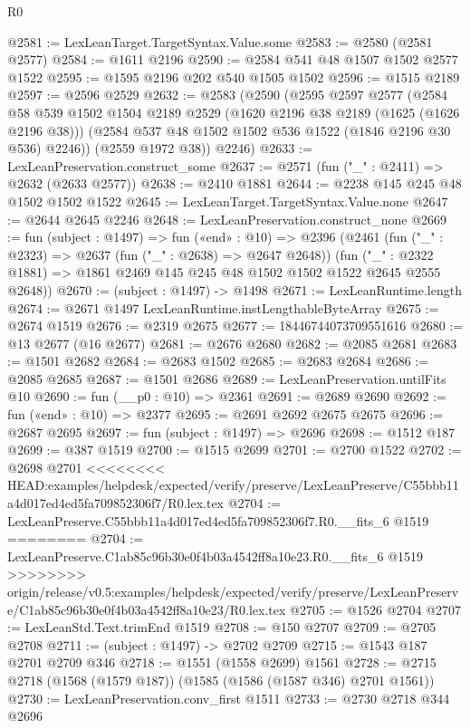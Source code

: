 \begin{lexlean}{R0}
\begin{coremodule}
{{{{{{{{{{{{{{{{{{{{{{{{{{{{{{{{{{{{{{{{{{{{{{{{{{{{{{{{{{{{{{{{{{{{{{{{{@2581 := LexLeanTarget.TargetSyntax.Value.some
@2583 := @2580 (@2581 @2577)
@2584 := @1611 @2196
@2590 := @2584 @541 @48 @1507 @1502 @2577 @1522
@2595 := @1595 @2196 @202 @540 @1505 @1502
@2596 := @1515 @2189
@2597 := @2596 @2529
@2632 := @2583
    (@2590
      (@2595
        @2597
        @2577
        (@2584
          @58
          @539
          @1502
          @1504
          @2189
          @2529
          (@1620 @2196 @38 @2189 (@1625 (@1626 @2196 @38)))
          (@2584 @537 @48 @1502 @1502 @536 @1522 (@1846 @2196 @30 @536) @2246))
        (@2559 @1972 @38))
      @2246)
@2633 := LexLeanPreservation.construct_some
@2637 := @2571 (fun ("_" : @2411) => @2632 (@2633 @2577))
@2638 := @2410 @1881
@2644 := @2238 @145 @245 @48 @1502 @1502 @1522
@2645 := LexLeanTarget.TargetSyntax.Value.none
@2647 := @2644 @2645 @2246
@2648 := LexLeanPreservation.construct_none
@2669 := fun (subject : @1497) =>
  fun («end» : @10) =>
  @2396
    (@2461
      (fun ("_" : @2323) => @2637 (fun ("_" : @2638) => @2647 @2648))
      (fun ("_" : @2322 @1881) => @1861 @2469 @145 @245 @48 @1502 @1502 @1522 @2645 @2555 @2648))
@2670 := (subject : @1497) -> @1498
@2671 := LexLeanRuntime.length
@2674 := @2671 @1497 LexLeanRuntime.instLengthableByteArray
@2675 := @2674 @1519
@2676 := @2319 @2675
@2677 := 18446744073709551616
@2680 := @13 @2677 (@16 @2677)
@2681 := @2676 @2680
@2682 := @2085 @2681
@2683 := @1501 @2682
@2684 := @2683 @1502
@2685 := @2683 @2684
@2686 := @2085 @2685
@2687 := @1501 @2686
@2689 := LexLeanPreservation.untilFits @10
@2690 := fun (__p0 : @10) => @2361
@2691 := @2689 @2690
@2692 := fun («end» : @10) => @2377
@2695 := @2691 @2692 @2675 @2675
@2696 := @2687 @2695
@2697 := fun (subject : @1497) => @2696
@2698 := @1512 @187
@2699 := @387 @1519
@2700 := @1515 @2699
@2701 := @2700 @1522
@2702 := @2698 @2701
<<<<<<<< HEAD:examples/helpdesk/expected/verify/preserve/LexLeanPreserve/C55bbb11a4d017ed4ed5fa709852306f7/R0.lex.tex
@2704 := LexLeanPreserve.C55bbb11a4d017ed4ed5fa709852306f7.R0.__fits_6 @1519
========
@2704 := LexLeanPreserve.C1ab85c96b30e0f4b03a4542ff8a10e23.R0.__fits_6 @1519
>>>>>>>> origin/release/v0.5:examples/helpdesk/expected/verify/preserve/LexLeanPreserve/C1ab85c96b30e0f4b03a4542ff8a10e23/R0.lex.tex
@2705 := @1526 @2704
@2707 := LexLeanStd.Text.trimEnd @1519
@2708 := @150 @2707
@2709 := @2705 @2708
@2711 := (subject : @1497) -> @2702 @2709
@2715 := @1543 @187 @2701 @2709 @346
@2718 := @1551 (@1558 @2699) @1561
@2728 := @2715 @2718 (@1568 (@1579 @187)) (@1585 (@1586 (@1587 @346) @2701 @1561))
@2730 := LexLeanPreservation.conv_first @1511
@2733 := @2730 @2718 @344 @2696
}}}}}}}}}}}}}}}}}}}}}}}}}}}}}}}}}}}}}}}}}}}}}}}}}}}}}}}}}}}}}}}}}}}}}}}}}
\end{coremodule}
\end{lexlean}
